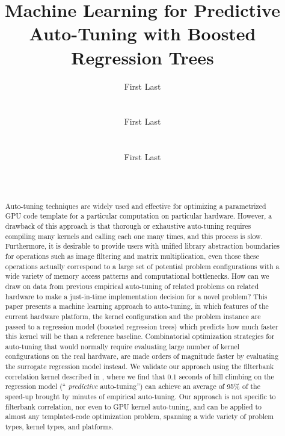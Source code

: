 \documentclass{sig-alternate}
\title{Machine Learning for Predictive Auto-Tuning with Boosted Regression Trees}
\author{
\alignauthor First Last\\
\affaddr{Affiliation line 1}\\
\affaddr{Affiliation line 2}\\
\email{anon@mail.com}
\alignauthor First Last\\
\affaddr{Affiliation line 1}\\
\affaddr{Affiliation line 2}\\
\email{anon@mail.com}
\alignauthor First Last\\
\affaddr{Affiliation line 1}\\
\affaddr{Affiliation line 2}\\
\email{anon@mail.com}
}
\begin{document}
\maketitle

\begin{abstract}

Auto-tuning techniques are widely used and effective for optimizing a
parametrized GPU code template for a particular computation on particular
hardware.
However, a drawback of this approach is that thorough or exhaustive
auto-tuning requires compiling many kernels and calling each one many times,
and this process is slow.  Furthermore, it is desirable to provide users
with unified library abstraction boundaries for operations such as image
filtering and matrix multiplication, even those these operations actually
correspond to a large set of potential problem configurations with a wide
variety of memory access patterns and computational bottlenecks.  How can we
draw on data from previous empirical auto-tuning of related problems on related
hardware to make a just-in-time implementation decision for a novel problem?
This paper presents a machine learning approach to auto-tuning, in which
features of the current hardware platform, the kernel configuration and the
problem instance are passed to a regression model (boosted regression trees)
which predicts how much faster this kernel will be than a reference
baseline.  Combinatorial optimization strategies for auto-tuning that would
normally require evaluating large number of kernel configurations on the real
hardware, are made orders of magnitude faster by evaluating the surrogate
regression model instead.  We validate our approach using the filterbank
correlation kernel described in \citet{pinto+cox:2011gcg}, where we find that
0.1 seconds of hill climbing on the regression model (``{\em
predictive} auto-tuning'') can achieve an average of 95\% of the
speed-up brought by minutes of empirical auto-tuning.  Our approach is not
specific to filterbank correlation, nor even to GPU kernel auto-tuning, and can
be applied to almost any templated-code optimization problem, spanning a wide
variety of problem types, kernel types, and platforms.

\end{abstract}


\end{document}
